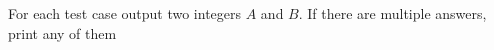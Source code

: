 For each test case output two integers $A$ and $B$.
If there are multiple answers, print any of them
